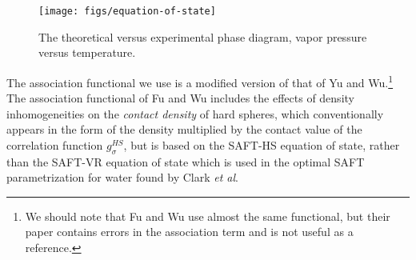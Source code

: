 \documentclass[letterpaper,twocolumn,amsmath,amssymb,prb]{revtex4-1}
\begin{document}
\begin{figure}
\begin{center}
\texttt{[image: figs/equation-of-state]}
\end{center}
\caption{The theoretical versus experimental phase diagram, vapor
  pressure versus temperature.  }
\label{fig:equation-of-state}
\end{figure}

The association functional we use is a modified version of that of Yu
and Wu\cite{yu2002fmt-dft-inhomogeneous-associating}.\footnote{We
  should note that Fu and Wu\cite{fu2005vapor-liquid-dft} use almost
  the same functional, but their paper contains errors in the
  association term and is not useful as a reference.}  The association
functional of Fu and Wu includes the effects of density
inhomogeneities on the \emph{contact density} of hard spheres, which
conventionally appears in the form of the density multiplied by the
contact value of the correlation function $g^{HS}_\sigma$, but is
based on the SAFT-HS equation of state, rather than the SAFT-VR
equation of state\cite{gil-villegas-1997-SAFT-VR} which is used in the
optimal SAFT parametrization for water found by Clark \emph{et
  al}\cite{clark2006developing}.
\end{document}
